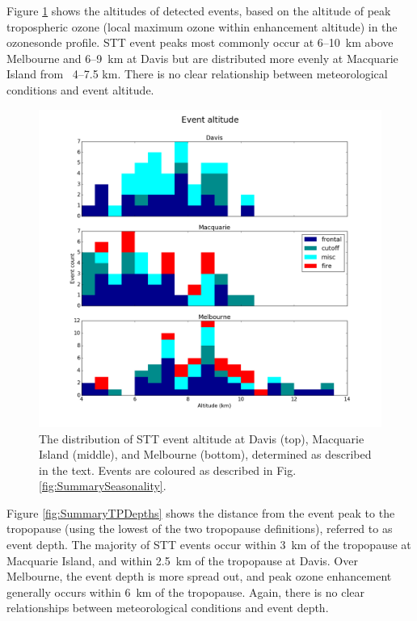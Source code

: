 \documentclass[acp, manuscript]{copernicus} %
\begin{document}
  Figure \ref{fig:SummaryAltitudes} shows the altitudes of detected events, based on the altitude of peak tropospheric ozone (local maximum ozone within enhancement altitude) in the ozonesonde profile.
  STT event peaks most commonly occur at 6--10~km above Melbourne and 6--9~km at Davis but are distributed more evenly at Macquarie Island from ~4--7.5 km.
  There is no clear relationship between meteorological conditions and event altitude.
  
  \begin{figure}[t]
    \includegraphics[width=12cm]{figures/summary_altitude.png}
    \caption{The distribution of STT event altitude at Davis (top), Macquarie Island (middle), and Melbourne (bottom), determined as described in the text.
    Events are coloured as described in Fig. \ref{fig:SummarySeasonality}.}
    \label{fig:SummaryAltitudes}
  \end{figure}

  Figure \ref{fig:SummaryTPDepths} shows the distance from the event peak to the tropopause (using the lowest of the two tropopause definitions), referred to as event depth.
  The majority of STT events occur within 3~km of the tropopause at Macquarie Island, and within 2.5~km of the tropopause at Davis. 
  Over Melbourne, the event depth is more spread out, and peak ozone enhancement generally occurs within 6~km of the tropopause.
  Again, there is no clear relationships between meteorological conditions and event depth.
\end{document}
